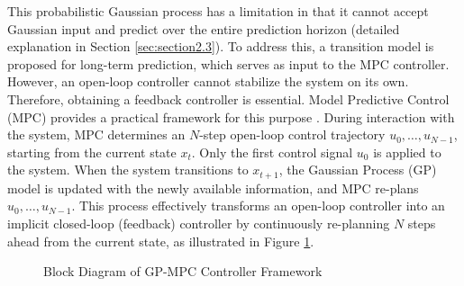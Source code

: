 This probabilistic Gaussian process has a limitation in that it cannot accept Gaussian input and predict over the entire prediction horizon (detailed explanation in Section \ref{sec:section2.3}). To address this, a transition model is proposed for long-term prediction, which serves as input to the MPC controller. However, an open-loop controller cannot stabilize the system on its own. Therefore, obtaining a feedback controller is essential. Model Predictive Control (MPC) provides a practical framework for this purpose \cite{mayne2000constrained}. During interaction with the system, MPC determines an $N$-step open-loop control trajectory $u_0, \ldots, u_{N-1}$, starting from the current state $x_t$. Only the first control signal $u_0$ is applied to the system\cite{Berberich_2021}. When the system transitions to $x_{t+1}$, the Gaussian Process (GP) model is updated with the newly available information, and MPC re-plans $u_0, \ldots, u_{N-1}$. This process effectively transforms an open-loop controller into an implicit closed-loop (feedback) controller by continuously re-planning $N$ steps ahead from the current state, as illustrated in Figure \ref{f:figure1}.


 \begin{figure}[ht]		%
  \centering
  \caption{Block Diagram of GP-MPC Controller Framework}
  \label{f:figure1}
\end{figure}



